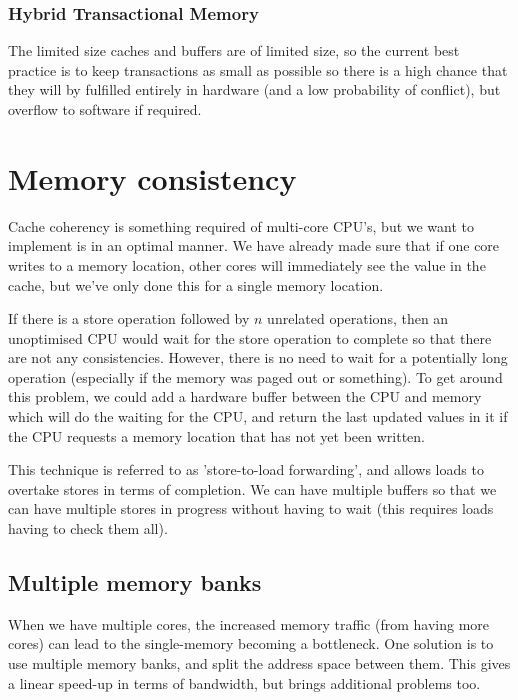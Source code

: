 \subsubsection{Hybrid Transactional Memory}

The limited size caches and buffers are of limited size, so the
current best practice is to keep transactions as small as possible so
there is a high chance that they will by fulfilled entirely in
hardware (and a low probability of conflict), but overflow to software
if required.




\section{Memory consistency}

Cache coherency is something required of multi-core CPU's, but we want
to implement is in an optimal manner. We have already made sure that
if one core writes to a memory location, other cores will immediately
see the value in the cache, but we've only done this for a single
memory location.

If there is a store operation followed by $n$ unrelated operations,
then an unoptimised CPU would wait for the store operation to complete
so that there are not any consistencies. However, there is no need to
wait for a potentially long operation (especially if the memory was
paged out or something). To get around this problem, we could add a
hardware buffer between the CPU and memory which will do the waiting
for the CPU, and return the last updated values in it if the CPU
requests a memory location that has not yet been written.

This technique is referred to as 'store-to-load forwarding', and
allows loads to overtake stores in terms of completion. We can have
multiple buffers so that we can have multiple stores in progress
without having to wait (this requires loads having to check them all).

\subsection{Multiple memory banks}

When we have multiple cores, the increased memory traffic (from having
more cores) can lead to the single-memory becoming a bottleneck. One
solution is to use multiple memory banks, and split the address space
between them. This gives a linear speed-up in terms of bandwidth, but
brings additional problems too.

